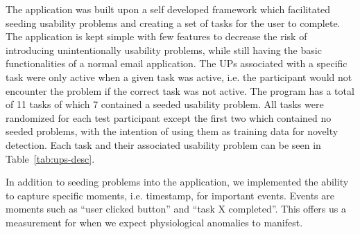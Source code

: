 The application was built upon a self developed framework which facilitated seeding usability problems and creating a set of tasks for the user to complete. 
The application is kept simple with few features to decrease the risk of introducing unintentionally usability problems, while still having the basic functionalities of a normal email application.  
The UPs associated with a specific task were only active when a given task was active, i.e. the participant would not encounter the problem if the correct task was not active.
The program has a total of 11 tasks of which 7 contained a seeded usability problem. 
All tasks were randomized for each test participant except the first two which contained no seeded problems, with the
intention of using them as training data for novelty detection. 
Each task and their associated usability problem can be seen in Table~\ref{tab:ups-desc}.

In addition to seeding problems into the application, we implemented the ability to capture specific moments, i.e. timestamp,
for important events. Events are moments such as ``user clicked button'' and ``task X completed''. This offers us a
measurement for when we expect physiological anomalies to manifest.

